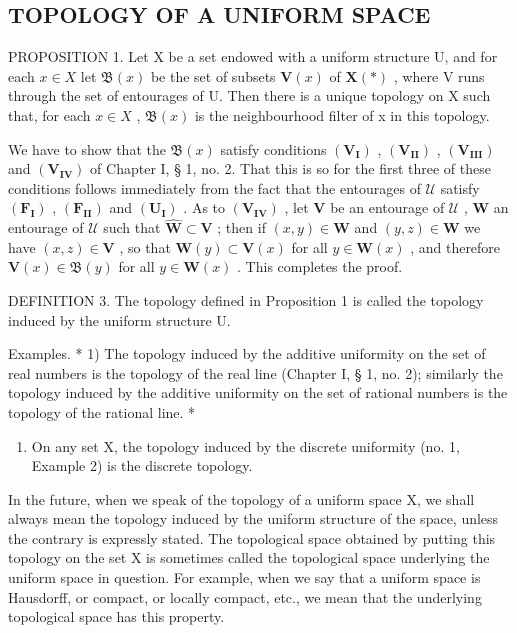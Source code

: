\subsection{TOPOLOGY OF A UNIFORM SPACE}

PROPOSITION 1. Let X be a set endowed with a uniform structure U, and for each \(x \in X\) let \(\mathfrak{B}(x)\) be the set of subsets \(\mathbf{V}(x)\) of \(\mathbf{X}(*)\) , where V runs through the set of entourages of U. Then there is a unique topology on X such that, for each \(x \in X\) , \(\mathfrak{B}(x)\) is the neighbourhood filter of x in this topology.

We have to show that the \(\mathfrak{B}(x)\) satisfy conditions \((\mathbf{V}_{\mathbf{I}})\) , \((\mathbf{V}_{\mathbf{II}})\) , \((\mathbf{V}_{\mathbf{III}})\) and \((\mathbf{V}_{\mathbf{IV}})\) of Chapter I, § 1, no. 2. That this is so for the first three of these conditions follows immediately from the fact that the entourages of \(\mathcal{U}\) satisfy \((\mathbf{F}_{\mathbf{I}})\) , \((\mathbf{F}_{\mathbf{II}})\) and \((\mathbf{U}_{\mathbf{I}})\) . As to \((\mathbf{V}_{\mathbf{IV}})\) , let \(\mathbf{V}\) be an entourage of \(\mathcal{U}\) , \(\mathbf{W}\) an entourage of \(\mathcal{U}\) such that \(\hat{\mathbf{W}} \subset \mathbf{V}\) ; then if \((x, y) \in \mathbf{W}\) and \((y, z) \in \mathbf{W}\) we have \((x, z) \in \mathbf{V}\) , so that \(\mathbf{W}(y) \subset \mathbf{V}(x)\) for all \(y \in \mathbf{W}(x)\) , and therefore \(\mathbf{V}(x) \in \mathfrak{B}(y)\) for all \(y \in \mathbf{W}(x)\) . This completes the proof.

DEFINITION 3. The topology defined in Proposition 1 is called the topology induced by the uniform structure U.

Examples. * 1) The topology induced by the additive uniformity on the set of real numbers is the topology of the real line (Chapter I, § 1, no. 2); similarly the topology induced by the additive uniformity on the set of rational numbers is the topology of the rational line. *

\begin{enumerate}
\def\labelenumi{\arabic{enumi})}
\setcounter{enumi}{1}
\tightlist
\item
  On any set X, the topology induced by the discrete uniformity (no. 1, Example 2) is the discrete topology.
\end{enumerate}

In the future, when we speak of the topology of a uniform space X, we shall always mean the topology induced by the uniform structure of the space, unless the contrary is expressly stated. The topological space obtained by putting this topology on the set X is sometimes called the topological space underlying the uniform space in question. For example, when we say that a uniform space is Hausdorff, or compact, or locally compact, etc., we mean that the underlying topological space has this property.

